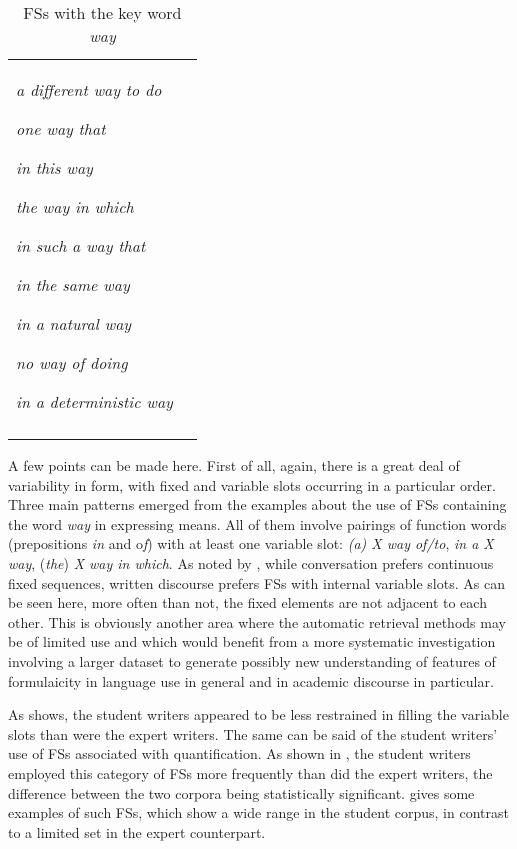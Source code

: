 \documentclass[output=paper]{langscibook}
\begin{document}
\begin{table}
\begin{tabularx}{\textwidth}{QQ}
\textit{a different way to do}

\textit{one way that}

\textit{in this way}

\textit{the way in which}

\textit{in such a way that}

\textit{in the same way}

\textit{in a natural way}

\textit{no way of doing}

\textit{in a deterministic way}\\
\lspbottomrule
\end{tabularx}
\caption{FSs with the key word \textit{way}\label{tab:wang:9}}
\end{table}

A few points can be made here. First of all, again, there is a great deal of variability in form, with fixed and variable slots occurring in a particular order. Three main patterns emerged from the examples about the use of FSs containing the word \textit{way} in expressing means. All of them involve pairings of function words (prepositions \textit{in} and o\textit{f}) with at least one variable slot: \textit{(a) X way of/to}, \textit{in a X way}, (\textit{the}) \textit{X way in which}. As noted by \citet{Biber2009}, while conversation prefers continuous fixed sequences, written discourse prefers FSs with internal variable slots. As can be seen here, more often than not, the fixed elements are not adjacent to each other. This is obviously another area where the automatic retrieval methods may be of limited use and which would benefit from a more systematic investigation involving a larger dataset to generate possibly new understanding of features of formulaicity in language use in general and in academic discourse in particular. 

As  shows, the student writers appeared to be less restrained in filling the variable slots than were the expert writers. The same can be said of the student writers’ use of FSs associated with quantification. As shown in , the student writers employed this category of FSs more frequently than did the expert writers, the difference between the two corpora being statistically significant.  gives some examples of such FSs, which show a wide range in the student corpus, in contrast to a limited set in the expert counterpart. 
\end{document}
